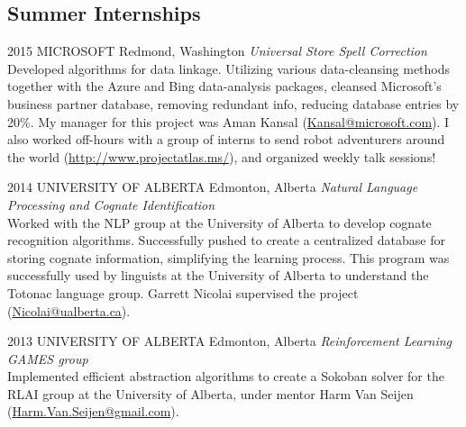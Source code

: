 \documentclass{friggeri-cv} %
\begin{document}
\pagebreak[4]
\subsection{Summer Internships}

\begin{entrylist}


\entry
{2015}
{MICROSOFT}
{Redmond, Washington}
{\emph{Universal Store Spell Correction} \\
Developed algorithms for data linkage. Utilizing various data-cleansing methods together with the Azure and Bing data-analysis packages, cleansed Microsoft's business partner database, removing redundant info, reducing database entries by 20\%. My manager for this project was Aman Kansal (\href{mailto:Kansal@microsoft.com}{Kansal@microsoft.com}). I also worked off-hours with a group of interns to send robot adventurers around the world (\href{http://www.projectatlas.ms/}{http://www.projectatlas.ms/}), and organized weekly talk sessions!}


\entry
{2014}
{UNIVERSITY OF ALBERTA}
{Edmonton, Alberta}
{\emph{Natural Language Processing and Cognate Identification} \\
Worked with the NLP group at the University of Alberta to develop cognate recognition algorithms. Successfully pushed to create a centralized database for storing cognate information, simplifying the learning process. This program was successfully used by linguists at the University of Alberta to understand the Totonac language group. Garrett Nicolai supervised the project (\href{mailto:Nicolai@ualberta.ca}{Nicolai@ualberta.ca}).}


\entry
{2013}
{UNIVERSITY OF ALBERTA}
{Edmonton, Alberta}
{\emph{Reinforcement Learning GAMES group} \\
Implemented efficient abstraction algorithms to create a Sokoban solver for the RLAI group at the University of Alberta, under mentor Harm Van Seijen (\href{mailto:Harm.Van.Seijen@gmail.com}{Harm.Van.Seijen@gmail.com}).}


\end{entrylist}

\end{document}
